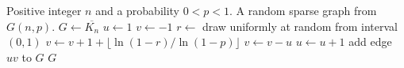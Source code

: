 
\begin{algorithmic}[1]
\Require Positive integer $n$ and a probability $0 < p < 1$.
\Ensure A random sparse graph from $G(n,p)$.
\State $G \gets \overline{K_n}$
\State $u \gets 1$
\State $v \gets -1$
  \State $r \gets$ draw uniformly at random from interval $(0,1)$
  \State $v \gets v + 1 + \lfloor \ln(1 - r) / \ln(1 - p) \rfloor$
    \State $v \gets v - u$
    \State $u \gets u + 1$
  \EndWhile
    \State add edge $uv$ to $G$
  \EndIf
\EndWhile
\State \Return $G$
\end{algorithmic}
